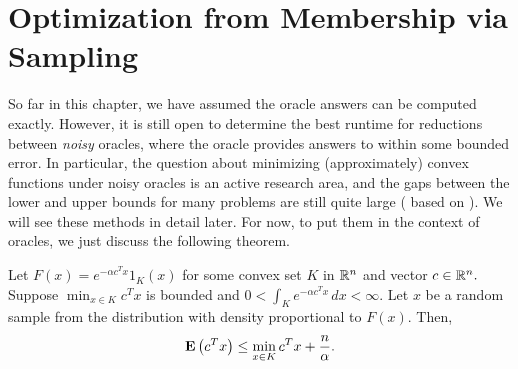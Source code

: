 
\section{Optimization from Membership via Sampling}

So far in this chapter, we have assumed the oracle answers can be
computed exactly. However, it is still open to determine the best
runtime for reductions between \emph{noisy} oracles, where the oracle
provides answers to within some bounded error. In particular, the
question about minimizing (approximately) convex functions under noisy
oracles is an active research area, and the gaps between the lower
and upper bounds for many problems are still quite large (\cite{belloni2015escaping,Feldman2015statistical,bubeck2016kernel}
based on \cite{Kalai2006simulated}). We will see these methods in
detail later. For now, to put them in the context of oracles, we just
discuss the following theorem.
\begin{thm}
\label{thm:OPTviaSampling} Let $F(x)=e^{-\alpha c^{T}x}1_{K}(x)$
for some convex set $K$ in $\mathbb{R}^{n}$ and vector $c\in\mathbb{R}^{n}.$ Suppose
$\min_{x\in K}c^{T}x$ is bounded and $0<\int_{K}e^{-\alpha c^{T}x}\,dx<\infty$.
Let $x$ be a random sample from the distribution with density proportional
to $F(x)$. Then, 
\[
\mathbf{E}\left(c^{T}x\right)\le\min_{x\in K}c^{T}x+\frac{n}{\alpha}.
\]
\end{thm}

